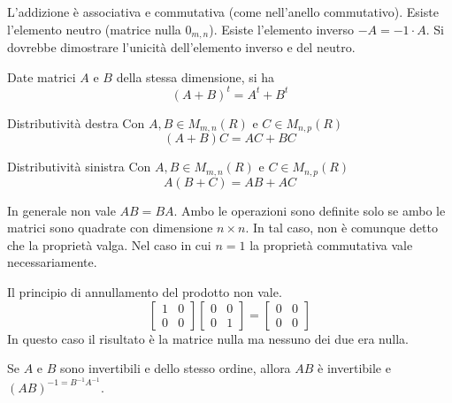 \documentclass[a4paper]{article}
\begin{document}
L'addizione è associativa e commutativa (come nell'anello commutativo).
Esiste l'elemento neutro (matrice nulla \(0_{m,n}\)).
Esiste l'elemento inverso \(-A = -1 \cdot A\).
Si dovrebbe dimostrare l'unicità dell'elemento inverso e del neutro.

\begin{snippetproposition}{}
    Date matrici \(A\) e \(B\) della stessa dimensione, si ha
    \[
        {(A+B)}^t = A^t + B^t
    \]
\end{snippetproposition}

\begin{snippetproposition}{Distributività destra}
    Con \(A, B \in M_{m,n}(R)\) e \(C \in M_{n,p}(R)\)
    \[
        (A+B)C = AC + BC
    \]
\end{snippetproposition}

\begin{snippetproposition}{Distributività sinistra}
    Con \(A, B \in M_{m,n}(R)\) e \(C \in M_{n,p}(R)\)
    \[
        A(B+C) = AB + AC
    \]
\end{snippetproposition}

In generale non vale \(AB=BA\). Ambo le operazioni sono definite solo se ambo le matrici sono quadrate
con dimensione \(n\times n\). In tal caso, non è comunque detto che la proprietà valga.
Nel caso in cui \(n=1\) la proprietà commutativa vale necessariamente.

Il principio di annullamento del prodotto non vale.
\[
    \begin{bmatrix}
        1 & 0 \\
        0 & 0
    \end{bmatrix}
    \begin{bmatrix}
        0 & 0 \\
        0 & 1
    \end{bmatrix}
    =
    \begin{bmatrix}
        0 & 0 \\
        0 & 0
    \end{bmatrix}
\]
In questo caso il risultato è la matrice nulla ma nessuno dei due era nulla.

\begin{snippetproposition}{}
    Se \(A\) e \(B\) sono invertibili e dello stesso ordine, allora
    \(AB\) è invertibile e \({(AB)}^{-1 = B^{-1}A^{-1}}\).
\end{snippetproposition}
\end{document}

